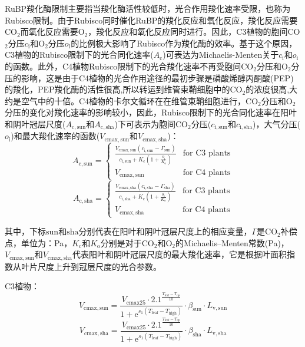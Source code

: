 RuBP羧化酶限制主要指当羧化酶活性较低时，光合作用羧化速率受限，也称为Rubisco限制。由于Rubisco同时催化RuBP的羧化反应和氧化反应，羧化反应需要CO$_2$而氧化反应需要O$_2$，羧化反应和氧化反应同时进行。因此，C3植物的胞间CO$_2$分压$c_{\mathrm {i}}$和O$_2$分压$o_{\mathrm {i}}$的比例极大影响了Rubisco作为羧化酶的效率。基于这个原因，C3植物的Rubisco限制下的光合同化速率($A_{\mathrm {c}}$)可表达为Michaelis-Menten关于$c_{\mathrm {i}}$和$o_{\mathrm {i}}$的函数。此外，C4植物Rubisco限制下的光合羧化速率不再受胞间CO$_2$分压和O$_2$分压的影响，这是由于C4植物的光合作用途径的最初步骤是磷酸烯醇丙酮酸(PEP)的羧化，PEP羧化酶的活性很高,所以转运到维管束鞘细胞中的CO$_2$的浓度很高,大约是空气中的十倍。C4植物的卡尔文循环在在维管束鞘细胞进行，CO$_2$分压和O$_2$分压的变化对羧化速率的影响较小，因此，Rubisco限制下的光合同化速率在阳叶和阴叶冠层尺度($A_{\mathrm{c,sun}}$和$A_{\mathrm{c,sha}}$)下可表示为胞间CO$_2$分压($c_{\mathrm{i,sun}}$和$c_{\mathrm{i,sha}}$)，大气分压($o_{\mathrm{i}}$)和最大羧化速率的函数($V_{\mathrm{cmax,sun}}$和$V_{\mathrm{cmax,sha}}$)：
\begin{equation}\label{A_C1sun}
A_{\mathrm{c,sun}}=\begin{cases}
\frac{V_{\mathrm{cmax,sun}}\left(c_{\mathrm{i,sun}}-\Gamma_{\mathrm{sun}}\right)}{c_{\mathrm{i,sun}}+K_{\mathrm{c}}\left(1+\frac{o_{\mathrm{i}}}{K_{\mathrm{o}}}\right)}
     & \text{for C3 plants} \\
V_{\mathrm{cmax,sun }} & \text{for C4 plants}
\end{cases}
\end{equation}
\begin{equation}\label{A_C1sha}
A_{\mathrm{c,sha}}=\begin{cases}
\frac{V_{\mathrm{cmax,sha}}\left(c_{\mathrm{i,sha}}-\Gamma_{\mathrm{sha}}\right)}{c_{\mathrm{i,sha}}+K_{\mathrm{c}}\left(1+\frac{o_{\mathrm{i}}}{K_{\mathrm{o}}}\right)}
     & \text{for C3 plants} \\
V_{\mathrm{cmax,sha }} & \text{for C4 plants}
\end{cases}
\end{equation}

其中，下标${\mathrm {sun}}$和${\mathrm {sha}}$分别代表在阳叶和阴叶冠层尺度上的相应变量，$\Gamma$是CO$_2$补偿点，单位为：Pa，$K_{\mathrm {c}}$和$K_{\mathrm {o}}$分别是对于CO$_2$和O$_2$的Michaelis--Menten常数(Pa)，$V_{\mathrm{cmax,sun}}$和$V_{\mathrm{cmax,sha}}$代表阳叶和阴叶冠层尺度的最大羧化速率，它是根据叶面积指数从叶片尺度上升到冠层尺度的光合参数。

C3植物：
\begin{equation}\label{V_cmaxsun_a}
V_{\mathrm{cmax,sun }}=\frac{V_{\mathrm{cmax 25}} \cdot 2.1^{\frac{T_{\mathrm{{leaf }}}-T_{\mathrm{o p}}}{10}}}{1+{\mathrm e}^{s_{\mathrm{1}}\left(T_{\mathrm{{leaf }}}-T_{\mathrm{{high }}}\right)}} \cdot \beta_{\mathrm{sun}} \cdot L_{\mathrm{v,sun}}
\end{equation}
\begin{equation}\label{V_cmaxsha_a}
V_{\mathrm{cmax,sha }}=\frac{V_{\mathrm{cmax 25}} \cdot 2.1^{\frac{T_{\mathrm{{leaf }}}-T_{\mathrm{o p}}}{10}}}{1+{\mathrm e}^{s_{\mathrm{1}}\left(T_{\mathrm{{leaf }}}-T_{\mathrm{{high }}}\right)}} \cdot \beta_{\mathrm{sha}} \cdot L_{\mathrm{v,sha}}
\end{equation}

